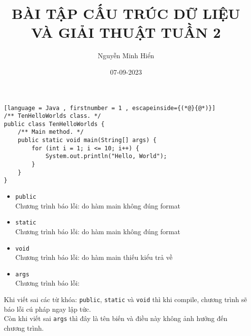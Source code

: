 \documentclass[12pt]{article}
\title{BÀI TẬP CẤU TRÚC DỮ LIỆU VÀ GIẢI THUẬT TUẦN 2}
\author{Nguyễn Minh Hiển}
\date{07-09-2023}
\begin{document}
\maketitle

\begin{exercise}
\begin{lstlisting}[language = Java , firstnumber = 1 , escapeinside={(*@}{@*)}]
/** TenHelloWorlds class. */
public class TenHelloWorlds {
    /** Main method. */
    public static void main(String[] args) {
        for (int i = 1; i <= 10; i++) {
            System.out.println("Hello, World");
        }
    }
}
\end{lstlisting}
\end{exercise}
        
\begin{exercise}
\begin{itemize}
    \item \lstinline{public}\\
    Chương trình báo lỗi:  do hàm main không đúng format
    \item \lstinline{static}\\
    Chương trình báo lỗi:  do hàm main không đúng format
    \item \lstinline{void}\\
    Chương trình báo lỗi:  do hàm main thiếu kiểu trả về
    \item \lstinline{args}\\
    Chương trình báo lỗi: 
\end{itemize}
\end{exercise}

\begin{exercise}
Khi viết sai các từ khóa: \lstinline{public}, \lstinline{static} và 
\lstinline{void} thì khi compile, chương trình sẽ báo lỗi cú pháp 
ngay lập tức.\\
Còn khi viết sai \lstinline{args} thì đây là tên biến và điều này
không ảnh hưởng đến chương trình.
\end{exercise}
\end{document}
